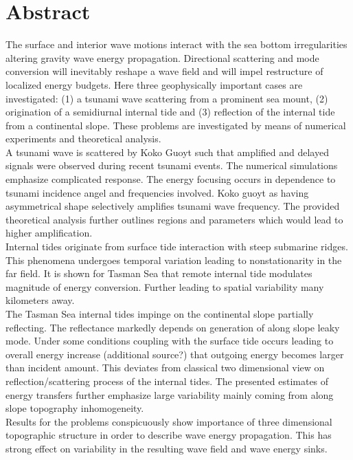 \section*{Abstract}
The surface and interior wave motions interact with the sea bottom irregularities altering gravity wave energy propagation. Directional scattering and mode conversion will inevitably reshape a wave field and will impel restructure of localized energy budgets. Here three geophysically important cases are investigated: (1) a tsunami wave scattering from a prominent sea mount, (2) origination of a semidiurnal internal tide and (3) reflection of the internal tide from a continental slope. These problems are investigated by means of numerical experiments and theoretical analysis.\\
A tsunami wave is scattered by Koko Guoyt such that amplified and delayed signals were observed during recent tsunami events. The numerical simulations emphasize complicated response. The energy focusing occurs in dependence to tsunami incidence angel and frequencies involved. Koko guoyt as having asymmetrical shape selectively amplifies tsunami wave frequency. The provided theoretical analysis further outlines regions and parameters which would lead to higher amplification.\\
Internal tides originate from surface tide interaction with steep submarine ridges. This phenomena undergoes temporal variation leading to nonstationarity in the far field. It is shown for Tasman Sea that remote internal tide modulates magnitude of energy conversion. Further leading to spatial variability many kilometers away.\\
The Tasman Sea internal tides impinge on the continental slope partially reflecting. The reflectance markedly depends on generation of along slope leaky mode. Under some conditions coupling with the surface tide occurs leading to overall energy increase (additional source?) that outgoing energy becomes larger than incident amount. This deviates from classical two dimensional view on reflection/scattering process of the internal tides. The presented estimates of energy transfers further emphasize large variability mainly coming from along slope topography inhomogeneity.\\
Results for the problems conspicuously show importance of three dimensional topographic structure in order to describe wave energy propagation. This has strong effect on variability in the resulting wave field and wave energy sinks.

\newpage
